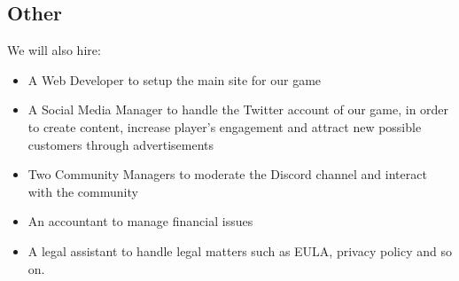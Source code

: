 ﻿\subsection{Other}

We will also hire:

\begin{itemize}
	\item A Web Developer to setup the main site for our game
	\item A Social Media Manager to handle the Twitter account of our game, in order to create content, increase player's engagement and attract new possible customers through advertisements
	\item Two Community Managers to moderate the Discord channel and interact with the community 
	\item An accountant to manage financial issues
	\item A legal assistant to handle legal matters such as EULA, privacy policy and so on.
\end{itemize}


